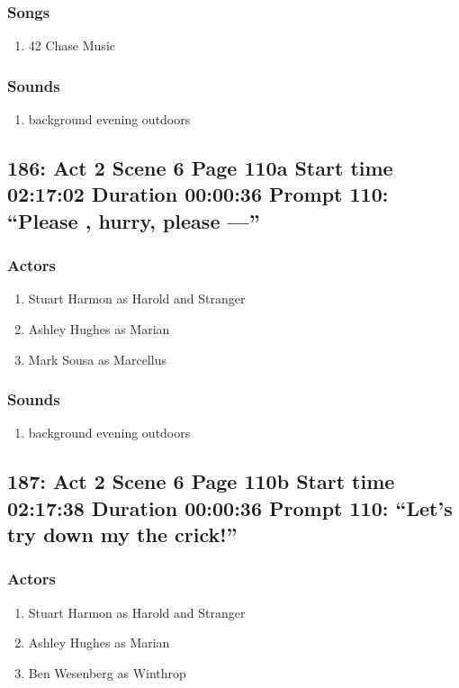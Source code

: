 \subsubsection{Songs}
\begin{enumerate}
\item 42 Chase Music
\end{enumerate}\subsubsection{Sounds}
\begin{enumerate}
\item background evening outdoors
\end{enumerate}
\subsection{186: Act 2 Scene 6 Page 110a Start time 02:17:02 Duration 00:00:36 Prompt 110: ``Please , hurry, please ---''}

\subsubsection{Actors}
\begin{enumerate}
\item Stuart Harmon as Harold and Stranger
\item Ashley Hughes as Marian
\item Mark Sousa as Marcellus
\end{enumerate}

\subsubsection{Sounds}
\begin{enumerate}
\item background evening outdoors
\end{enumerate}
\subsection{187: Act 2 Scene 6 Page 110b Start time 02:17:38 Duration 00:00:36 Prompt 110: ``Let's try down my the crick!''}

\subsubsection{Actors}
\begin{enumerate}
\item Stuart Harmon as Harold and Stranger
\item Ashley Hughes as Marian
\item Ben Wesenberg as Winthrop
\end{enumerate}

